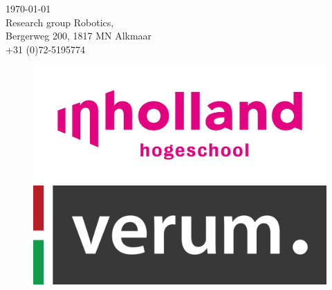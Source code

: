 \documentclass[12pt]{scrreprt}
\begin{document}
\begin{titlepage}


{\large \today}\\[2cm] %


 

\Large Research group Robotics,\\ Bergerweg 200, 1817 MN Alkmaar\\
+31 (0)72-5195774


\begin{figure}[H]
  \centering
  \begin{minipage}[b]{0.4\textwidth}
    \includegraphics[width=\textwidth]{Figures/inholland.jpg}  \end{minipage}
  \hfill
  \begin{minipage}[b]{0.4\textwidth}
    \includegraphics[width=\textwidth]{Figures/verum_logo.png}
  \end{minipage}
\end{figure}



\end{titlepage}
\end{document}
